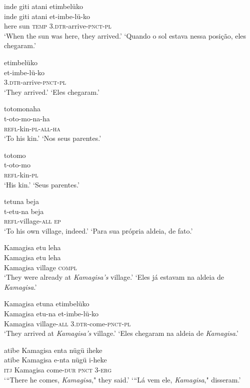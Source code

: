 \documentclass[output=paper,
modfonts,nonflat
]{langsci/langscibook}
\begin{document}
\ea  inde giti atani etimbelüko\\[.3em]
\gll inde giti atani et-imbe-lü-ko\\
     here sun \textsc{temp} \textsc{3.dtr}-arrive-\textsc{pnct}-\textsc{pl}\\
\glt ‘When the sun was here, they arrived.’
\glt ‘Quando o sol estava nessa posição, eles chegaram.’
\z

\ea  etimbelüko\\[.3em]
\gll et-imbe-lü-ko\\
     \textsc{3.dtr}-arrive-\textsc{pnct}-\textsc{pl}\\
\glt ‘They arrived.’
\glt ‘Eles chegaram.’
\z

\ea  totomonaha\\[.3em]
\gll t-oto-mo-na-ha\\
     \textsc{refl}-kin-\textsc{pl}-\textsc{all}-\textsc{ha}\\
\glt ‘To his kin.’
\glt ‘Nos seus parentes.’
\z

\ea  totomo\\[.3em]
\gll t-oto-mo\\
     \textsc{refl}-kin-\textsc{pl}\\
\glt ‘His kin.’
\glt ‘Seus parentes.’
\z

\ea  tetuna beja\\[.3em]
\gll t-etu-na beja\\
     \textsc{refl}-village-\textsc{all} \textsc{ep}\\
\glt ‘To his own village, indeed.’
\glt ‘Para sua própria aldeia, de fato.’
\z

\ea  Kamagisa etu leha\\[.3em]
\gll Kamagisa etu leha\\
     Kamagisa village \textsc{compl}\\
\glt ‘They were already at \textit{Kamagisa's} village.’
\glt ‘Eles já estavam na aldeia de \textit{Kamagisa}.’
\z

\ea  Kamagisa etuna etimbelüko\\[.3em]
\gll Kamagisa etu-na et-imbe-lü-ko\\
     Kamagisa village-\textsc{all} \textsc{3.dtr}-come-\textsc{pnct}-\textsc{pl}\\
\glt ‘They arrived at \textit{Kamagisa's} village.’
\glt ‘Eles chegaram na aldeia de \textit{Kamagisa}.’
\z

\ea  atibe Kamagisa enta nügü iheke\\[.3em]
\gll atibe Kamagisa e-nta nügü i-heke\\
     \textsc{itj} Kamagisa come-\textsc{dur} \textsc{pnct} 3-\textsc{erg}\\
\glt ‘“There he comes, \textit{Kamagisa}," they said.’
\glt ‘“Lá vem ele, \textit{Kamagisa}," disseram.’
\z
\end{document}
